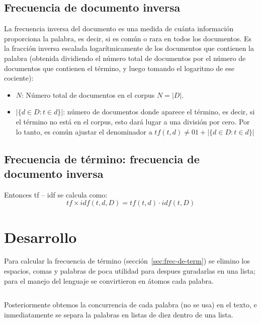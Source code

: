 \documentclass{IEEEtran}
\begin{document}
\subsection{Frecuencia de documento inversa}\label{sec:frec-de-docum}
La frecuencia inversa del documento es una medida de cuánta información
proporciona la palabra, es decir, si es común o rara en todos los documentos.
Es la fracción inversa escalada logarítmicamente de los documentos que
contienen la palabra (obtenida dividiendo el número total de documentos
por el número de documentos que contienen el término, y luego tomando el
logaritmo de ese cociente):
\begin{itemize}
  \item $N$: Número total de documentos en el corpus $N = |D| $.
  \item $|\{d \in D : t \in d\}|$: número de documentos donde aparece el término,
        es decir, si el término no está en el corpus, esto dará lugar a una división por cero. Por lo tanto, es     común ajustar el denominador a $tf(t,d) \ne 01 + |\{d \in D : t \in d \}|$

\end{itemize}

\subsection{Frecuencia de término: frecuencia de documento inversa}\label{sec:frec-de-term-1}
Entonces tf – idf se calcula como:
\[ tf \times idf(t,d,D) = tf(t,d) \cdot idf(t,D)\]

\section{Desarrollo}\label{sec:desarrollo}

Para calcular la frecuencia de término (sección~\ref{sec:frec-de-term}) se
elimino los espacios, comas y palabras de poca utilidad para despues guradarlas
en una lista; para el manejo del lenguaje se convirtieron en átomos cada palabra.
\begin{code}
  \inputminted[firstline=5,lastline=26]{elixir}{../lib/corpus.ex}
\end{code}

Posteriormente obtemos la concurrencia de cada palabra (no se usa) en el texto,
e inmediatamente se separa la palabras en listas de diez dentro de una lista.
\begin{code}
  \inputminted[firstline=29,lastline=43]{elixir}{../lib/corpus.ex}
\end{code}
\end{document}
